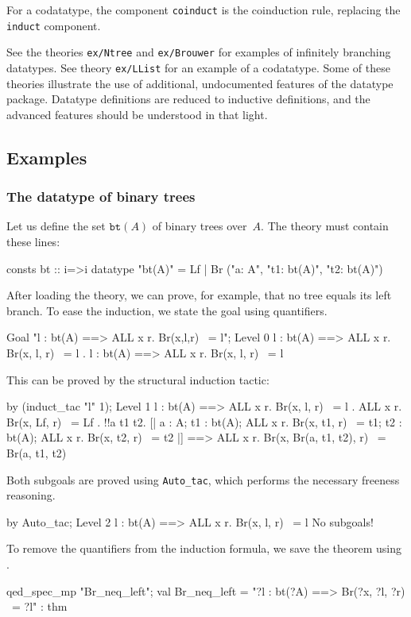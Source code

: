 For a codatatype, the component \texttt{coinduct} is the coinduction rule,
replacing the \texttt{induct} component.

See the theories \texttt{ex/Ntree} and \texttt{ex/Brouwer} for examples of
infinitely branching datatypes.  See theory \texttt{ex/LList} for an example
of a codatatype.  Some of these theories illustrate the use of additional,
undocumented features of the datatype package.  Datatype definitions are
reduced to inductive definitions, and the advanced features should be
understood in that light.


\subsection{Examples}

\subsubsection{The datatype of binary trees}

Let us define the set $\texttt{bt}(A)$ of binary trees over~$A$.  The theory
must contain these lines:
\begin{ttbox}
consts   bt :: i=>i
datatype "bt(A)"  =  Lf  |  Br ("a: A",  "t1: bt(A)",  "t2: bt(A)")
\end{ttbox}
After loading the theory, we can prove, for example, that no tree equals its
left branch.  To ease the induction, we state the goal using quantifiers.
\begin{ttbox}
Goal "l : bt(A) ==> ALL x r. Br(x,l,r) ~= l";
{\out Level 0}
{\out l : bt(A) ==> ALL x r. Br(x, l, r) ~= l}
{. l : bt(A) ==> ALL x r. Br(x, l, r) ~= l}
\end{ttbox}
This can be proved by the structural induction tactic:
\begin{ttbox}
by (induct_tac "l" 1);
{\out Level 1}
{\out l : bt(A) ==> ALL x r. Br(x, l, r) ~= l}
{. ALL x r. Br(x, Lf, r) ~= Lf}
{. !!a t1 t2.}
{\out        [| a : A; t1 : bt(A); ALL x r. Br(x, t1, r) ~= t1; t2 : bt(A);}
{\out           ALL x r. Br(x, t2, r) ~= t2 |]}
{\out        ==> ALL x r. Br(x, Br(a, t1, t2), r) ~= Br(a, t1, t2)}
\end{ttbox}
Both subgoals are proved using \texttt{Auto_tac}, which performs the necessary
freeness reasoning. 
\begin{ttbox}
by Auto_tac;
{\out Level 2}
{\out l : bt(A) ==> ALL x r. Br(x, l, r) ~= l}
{\out No subgoals!}
\end{ttbox}
To remove the quantifiers from the induction formula, we save the theorem using
.
\begin{ttbox}
qed_spec_mp "Br_neq_left";
{\out val Br_neq_left = "?l : bt(?A) ==> Br(?x, ?l, ?r) ~= ?l" : thm}
\end{ttbox}

